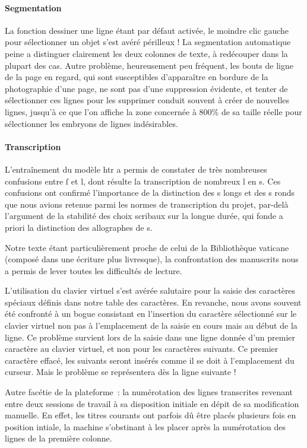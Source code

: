 \documentclass{article}
\begin{document}
	\paragraph{Segmentation}
	La fonction dessiner une ligne étant par défaut activée, le moindre clic gauche pour sélectionner un objet s'est avéré périlleux ! La segmentation automatique peine a distinguer clairement les deux colonnes de texte, à redécouper dans la plupart des cas. Autre problème, heureusement peu fréquent, les bouts de ligne de la page en regard, qui sont susceptibles d'apparaître en bordure de la photographie d'une page, ne sont pas d'une suppression évidente, et tenter de sélectionner ces lignes pour les supprimer conduit souvent à créer de nouvelles lignes, jusqu'à ce que l'on affiche la zone concernée à 800\% de sa taille réelle pour sélectionner les embryons de lignes indésirables.
	
	\paragraph{Transcription}
	L'entraînement du modèle \gls{htr} a permis de constater de très nombreuses confusions entre ſ et l, dont résulte la transcription de nombreux l en s. Ces confusions ont confirmé l'importance de la distinction des s longs et des s ronds que nous avions retenue parmi les normes de transcription du projet, par-delà l'argument de la stabilité des choix scribaux sur la longue durée, qui fonde a priori la distinction des allographes de s.
	
	Notre texte étant particulièrement proche de celui de la Bibliothèque vaticane (composé dans une écriture plus livresque), la confrontation des manuscrits nous a permis de lever toutes les difficultés de lecture.
	
	L'utilisation du clavier virtuel s'est avérée salutaire pour la saisie des caractères spéciaux définis dans notre table des caractères. En revanche, nous avons souvent été confronté à un bogue consistant en l'insertion du caractère sélectionné sur le clavier virtuel non pas à l'emplacement de la saisie en cours mais au début de la ligne. Ce problème survient lors de la saisie dans une ligne donnée d'un premier caractère au clavier virtuel, et non pour les caractères suivants. Ce premier caractère effacé, les suivants seront insérés comme il se doit à l'emplacement du curseur. Mais le problème se représentera dès la ligne suivante !
	
	Autre facétie de la plateforme~: la numérotation des lignes transcrites revenant entre deux sessions de travail à sa disposition initiale en dépit de sa modification manuelle. En effet, les titres courants ont parfois dû être placés plusieurs fois en position intiale, la machine s'obstinant à les placer après la numérotation des lignes de la première colonne.
	
\end{document}
